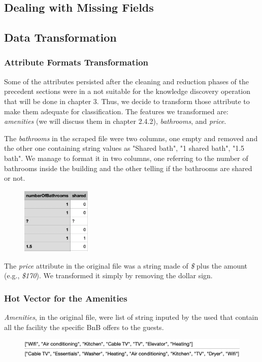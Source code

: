 \subsection{Dealing with Missing Fields}



\subsection{Data Transformation}

\subsubsection{Attribute Formats Transformation}
Some of the attributes persisted after the cleaning and reduction phases of the precedent sections were in a not suitable for the knowledge discovery operation that will be done in chapter 3. Thus, we decide to transform those attribute to make them adequate for classification. The features we transformed are: \textit{amenities} (we will discuss them in chapter 2.4.2), \textit{bathrooms}, and \textit{price}.

The \textit{bathrooms} in the scraped file were two columns, one empty and removed and the other one containing string values as "Shared bath", "1 shared bath", "1.5 bath". We manage to format it in two columns, one referring to the number of bathrooms inside the building and the other telling if the bathrooms are shared or not.
\begin{figure}[H]
	\centering
	\includegraphics[width=0.3\textwidth]{img/bath.png}  
\end{figure}

The \textit{price} attribute in the original file was a string made of \textit{\$} plus the amount (e.g., \textit{\$170}). We transformed it simply by removing the dollar sign.

\subsubsection{Hot Vector for the Amenities}
\textit{Amenities}, in the original file, were list of string inputed by the used that contain all the facility the specific BnB offers to the guests.
\begin{figure}[H]
	\centering
	\includegraphics[width=\textwidth]{img/amenities.png}  
\end{figure}

